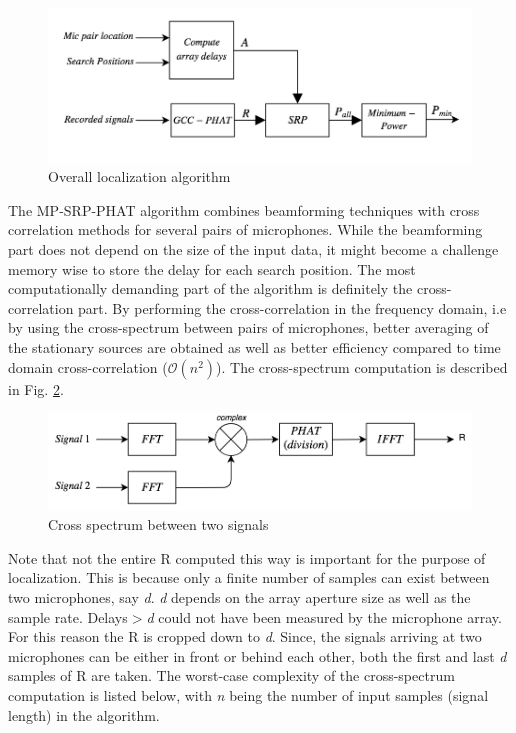 \begin{figure}[!ht]
    \centering
    \includegraphics[width=1\textwidth]{Figures/system1.png}
    \caption{Overall localization algorithm}
    \label{fig:systemimplementaiton}
\end{figure}

The MP-SRP-PHAT algorithm combines beamforming techniques with cross correlation methods for several pairs of microphones. While the beamforming part does not depend on the size of the input data, it might become a challenge memory wise to store the delay for each search position. The most computationally demanding part of the algorithm is definitely the cross-correlation part. By performing the cross-correlation in the frequency domain, i.e by using the cross-spectrum between pairs of microphones, better averaging of the stationary sources are obtained as well as better efficiency compared to time domain cross-correlation ($\mathcal{O}(n^2)$). The cross-spectrum computation is described in Fig. \ref{fig:crossspectrumsystem}.
\begin{figure}[H]
    \centering
    \includegraphics[width=1\textwidth]{Figures/crossspectra.png}
    \caption{Cross spectrum between two signals}
    \label{fig:crossspectrumsystem}
\end{figure}
Note that not the entire R computed this way is important for the purpose of localization. This is because only a finite number of samples can exist between two microphones, say \textit{d}. \textit{d} depends on the array aperture size as well as the sample rate. Delays$\gt$\textit{d} could not have been measured by the microphone array. For this reason the R is cropped down to \textit{d}. Since, the signals arriving at two microphones can be either in front or behind each other, both the first and last \textit{d} samples of R are taken. The worst-case complexity of the cross-spectrum computation is listed below, with \textit{n} being the number of input samples (signal length) in the algorithm. 

